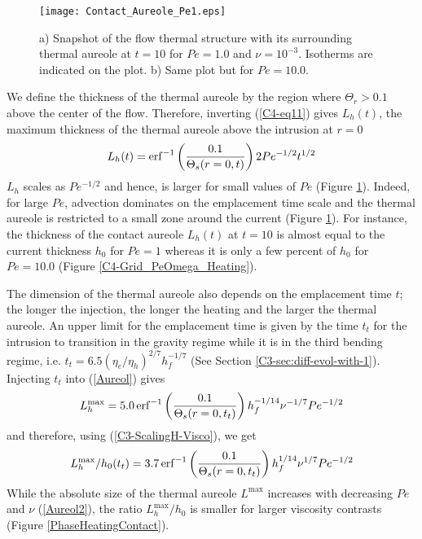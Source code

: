 \begin{figure}[h!]
  \begin{center}
    \graphicspath{ {/Users/thorey/Documents/These/Projet/Refroidissement/Skin_Model/Figure/Figure_Heating/} }
    \texttt{[image: Contact\_Aureole\_Pe1.eps]}
    \caption{a)  Snapshot  of  the  flow thermal  structure  with  its
      surrounding  thermal   aureole  at   $t=10$  for   $Pe=1.0$  and
      $\nu=10^{-3}$.  Isotherms  are indicated  on the plot.   b) Same
      plot but for $Pe=10.0$.}
    \label{Contact_Areuol2}
  \end{center}
\end{figure}

We define  the thickness of  the thermal  aureole by the  region where
$\Theta_r>0.1$  above the  center of  the flow.   Therefore, inverting
(\ref{C4-eq11}) gives  $L_h(t)$, the maximum thickness  of the thermal
aureole above the intrusion at $r=0$
\begin{equation}
  L_h(t)                                                           =
  \operatorname{erf}^{-1}\left(\frac{0.1}{\Theta_s(r=0,t)}\right)2Pe^{-1/2}t^{1/2}
  \label{Aureol}
\end{equation}
$L_h$ scales as  $Pe^{-1/2}$ and hence, is larger for  small values of
$Pe$ (Figure \ref{Contact_Areuol2}). Indeed, for large $Pe$, advection
dominates on  the emplacement  time scale and  the thermal  aureole is
restricted   to   a   small    zone   around   the   current   (Figure
\ref{Contact_Areuol2}).  For  instance, the  thickness of  the contact
aureole $L_h(t)$  at $t=10$ is  almost equal to the  current thickness
$h_0$  for $Pe=1$  whereas  it is  only  a few  percent  of $h_0$  for
$Pe=10.0$ (Figure \ref{C4-Grid_PeOmega_Heating}).

The dimension of  the thermal aureole also depends  on the emplacement
time $t$;  the longer the  injection, the  longer the heating  and the
larger the thermal aureole. An upper limit for the emplacement time is
given by the time $t_t$ for the intrusion to transition in the gravity
regime   while   it   is   in   the   third   bending   regime,   i.e.
$t_t=6.5(\eta_e/\eta_h)^{2/7}h_f^{-1/7}$          (See         Section
\ref{C3-sec:diff-evol-with-1}).   Injecting $t_t$  into (\ref{Aureol})
gives
\begin{equation}
  L_h^{\text{max}}                                                           =5.0  \operatorname{erf}^{-1}\left(\frac{0.1}{\Theta_s(r=0,t_{t})}\right)h_f^{-1/14}\nu^{-1/7}Pe^{-1/2}
  \label{Aureol2}
\end{equation}
and therefore, using (\ref{C3-ScalingH-Visco}), we get
\begin{equation}
  L_h^{\text{max}}/h_0(t_t)                                                           =3.7
  \operatorname{erf}^{-1}\left(\frac{0.1}{\Theta_s(r=0,t_{t})}\right)h_f^{1/14}\nu^{1/7}Pe^{-1/2}
  \label{Aureol3}
\end{equation}
While  the  absolute  size  of the  thermal  aureole  $L^{\text{max}}$
increases with  decreasing $Pe$  and $\nu$ (\ref{Aureol2}),  the ratio
$L_h^{\text{max}}/h_0$  is  smaller  for  larger  viscosity  contrasts
(Figure \ref{PhaseHeatingContact}).

